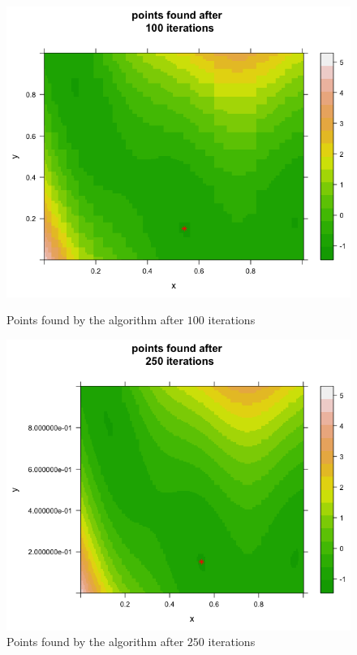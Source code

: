 \begin{figure}[!htb]
    \centering
    \begin{minipage}{.5\textwidth}
        \centering
        \includegraphics[width=1.064\linewidth, height=0.3\textheight]{gfx/chapter-bayesianrvfl/min_branin_100_iter.png}
        \caption{Points found by the algorithm after $100$ iterations}
        \label{min_branin_100_iter}
    \end{minipage}%
    \begin{minipage}{0.5\textwidth}
        \centering
        \includegraphics[width=1.064\linewidth, height=0.3\textheight]{gfx/chapter-bayesianrvfl/min_branin_250_iter.png}
        \caption{Points found by the algorithm after $250$ iterations}
        \label{min_branin_250_iter}
    \end{minipage}
\end{figure}

